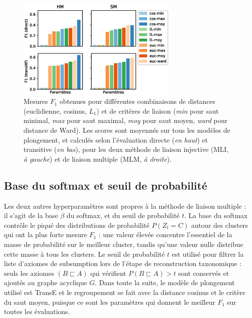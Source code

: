 
\begin{figure}[h]
    \centering
    \includegraphics[width=0.7\textwidth]{fig/plot/taxex_cluparams-all.eps}
    \caption[Influence des paramètres de regroupement sur l'extraction de taxonomie]{Mesures $F_1$ obtenues pour différentes combinaisons de distances (euclidienne, cosinus, $L_1$) et de critères de liaison (\textit{min} pour saut minimal, \textit{max} pour saut maximal, \textit{moy} pour saut moyen, \textit{ward} pour distance de Ward). Les scores sont moyennés sur tous les modèles de plongement, et calculés selon l'évaluation directe (\textit{en haut}) et transitive (\textit{en bas}), pour les deux méthode de liaison injective (MLI, \textit{à gauche}) et de liaison multiple (MLM, \textit{à droite}).}
    \label{fig:taxex-cluparams-all}
\end{figure}

\subsection{Base du softmax et seuil de probabilité}
\label{subsec:te-hp-softmapping}

Les deux autres hyperparamètres sont propres à la méthode de liaison multiple : il s'agit de la base $\beta$ du softmax, et du seuil de probabilité $t$. La base du softmax contrôle le piqué des distributions de probabilité $P(Z_t = C)$ autour des clusters qui ont la plus forte mesure $F_1$ : une valeur élevée concentre l'essentiel de la masse de probabilité sur le meilleur cluster, tandis qu'une valeur nulle distribue cette masse à tous les clusters. Le seuil de probabilité $t$ est utilisé pour filtrer la liste d'axiomes de subsumption lors de l'étape de reconstruction taxonomique : seuls les axiomes $(B \sqsubset A)$ qui vérifient $P(B \sqsubset A) > t$ sont conservés et ajoutés au graphe acyclique $G$. Dans toute la suite, le modèle de plongement utilisé est TransE et le regroupement se fait avec la distance cosinus et le critère du saut moyen, puisque ce sont les paramètres qui donnent le meilleur $F_1$ sur toutes les évaluations. 

